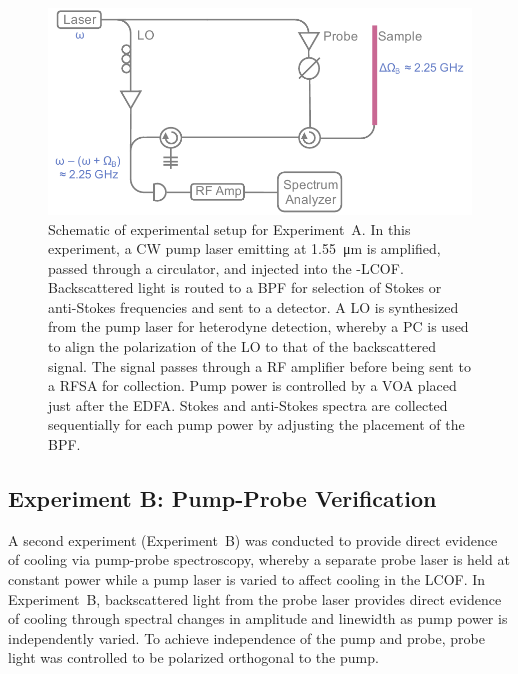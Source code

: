 \begin{figure}[t]
  \centering
  \includegraphics[width=\textwidth]{figs/3-Cooling/pumpOnlyDesign.pdf}
  \caption{Schematic of experimental setup for Experiment~A. In this experiment, a \ac{CW} pump laser emitting at \SI{1.55}{\micro\meter} is amplified, passed through a circulator, and injected into the -\ac{LCOF}. Backscattered light is routed to a \ac{BPF} for selection of Stokes or anti-Stokes frequencies and sent to a detector. A \ac{LO} is synthesized from the pump laser for heterodyne detection, whereby a \acl{PC} is used to align the polarization of the \ac{LO} to that of the backscattered signal. The signal passes through a \acl{RF} amplifier before being sent to a \ac{RFSA} for collection. Pump power is controlled by a \ac{VOA} placed just after the \ac{EDFA}. Stokes and anti-Stokes spectra are collected sequentially for each pump power by adjusting the placement of the \ac{BPF}.}
  \label{fig:Cooling:ExperimentADesign}
\end{figure}

\subsection{Experiment B: Pump-Probe Verification}
\label{Cooling:subsec:ExperimentBPump-ProbeVerification}

A second experiment (Experiment~B) was conducted to provide direct evidence of cooling via pump-probe spectroscopy, whereby a separate probe laser is held at constant power while a pump laser is varied to affect cooling in the \ac{LCOF}. In Experiment~B, backscattered light from the probe laser provides direct evidence of cooling through spectral changes in amplitude and linewidth as pump power is independently varied. To achieve independence of the pump and probe, probe light was controlled to be polarized orthogonal to the pump.

